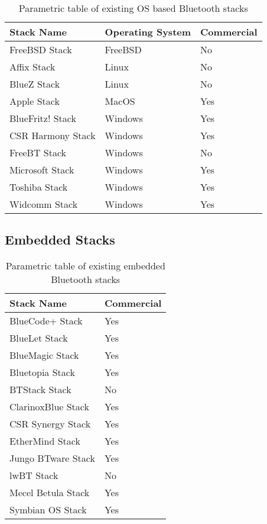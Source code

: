 \begin{table}[H]
	\begin{center}
		\begin{tabular}{ | l | l | l |}
			\hline
			\textbf{Stack Name}	& \textbf{Operating System}	& \textbf{Commercial} \\ \hline

			FreeBSD Stack		& FreeBSD	& No	\\ \hline
			Affix Stack			& Linux		& No	\\ \hline
			BlueZ Stack			& Linux		& No	\\ \hline
			Apple Stack			& MacOS		& Yes	\\ \hline
			BlueFritz! Stack	& Windows	& Yes	\\ \hline
			CSR Harmony Stack	& Windows	& Yes	\\ \hline
			FreeBT Stack 		& Windows	& No	\\ \hline
			Microsoft Stack		& Windows	& Yes	\\ \hline
			Toshiba Stack		& Windows	& Yes	\\ \hline
			Widcomm Stack		& Windows	& Yes	\\ \hline
		\end{tabular}
		\caption[Existing Operating System Bluetooth Stacks]{Parametric table of existing OS based Bluetooth stacks}
		\label{tab:osbtstacks}
	\end{center}
\end{table}


\subsection{Embedded Stacks}

\begin{table}[H]
	\begin{center}
		\begin{tabular}{ | l | l |}
			\hline
			\textbf{Stack Name}	& \textbf{Commercial} \\ \hline

			BlueCode+ Stack		& Yes	\\ \hline
			BlueLet Stack		& Yes	\\ \hline
			BlueMagic Stack		& Yes	\\ \hline
			Bluetopia Stack		& Yes	\\ \hline
			BTStack Stack		& No	\\ \hline
			ClarinoxBlue Stack	& Yes	\\ \hline
			CSR Synergy Stack	& Yes	\\ \hline
			EtherMind Stack		& Yes	\\ \hline
			Jungo BTware Stack	& Yes	\\ \hline
			lwBT Stack			& No	\\ \hline
			Mecel Betula Stack	& Yes	\\ \hline
			Symbian OS Stack	& Yes	\\ \hline
		\end{tabular}
		\caption[Existing Embedded Bluetooth Stacks]{Parametric table of existing embedded Bluetooth stacks}
		\label{tab:embbtstacks}
	\end{center}
\end{table}


